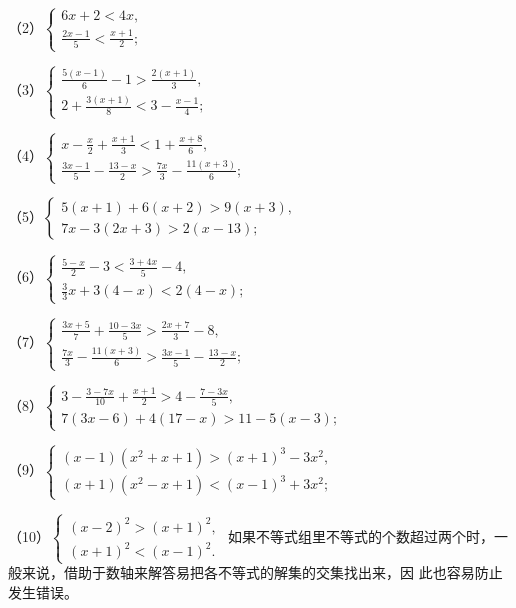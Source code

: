 （2）\(\left\{ \begin{array}{l} 6x + 2 < 4x, \\ \frac{2x - 1}{5} < \frac{x + 1}{2}; \end{array} \right.\)

（3）\(\left\{ \begin{array}{l} \frac{5(x - 1)}{6} - 1 > \frac{2(x + 1)}{3}, \\ 2 + \frac{3(x + 1)}{8} < 3 - \frac{x - 1}{4}; \end{array} \right.\)

（4）\(\left\{ \begin{array}{l} x - \frac{x}{2} + \frac{x + 1}{3} < 1 + \frac{x + 8}{6}, \\ \frac{3x - 1}{5} - \frac{13 - x}{2} > \frac{7x}{3} - \frac{11(x + 3)}{6}; \end{array} \right.\)

（5）\(\left\{ \begin{array}{l} 5(x + 1) + 6(x + 2) > 9(x + 3), \\ 7x - 3(2x + 3) > 2(x - 13); \end{array} \right.\)

（6）\(\left\{ \begin{array}{l} \frac{5 - x}{2} - 3 < \frac{3 + 4x}{5} - 4, \\ \frac{3}{3} x + 3(4 - x) < 2(4 - x); \end{array} \right.\)

（7）\(\left\{ \begin{array}{l} \frac{3x + 5}{7} + \frac{10 - 3x}{5} > \frac{2x + 7}{3} - 8, \\ \frac{7x}{3} - \frac{11(x + 3)}{6} > \frac{3x - 1}{5} - \frac{13 - x}{2}; \end{array} \right.\)

（8）\(\left\{ \begin{array}{l} 3 - \frac{3 - 7x}{10} + \frac{x + 1}{2} > 4 - \frac{7 - 3x}{5}, \\ 7(3x - 6) + 4(17 - x) > 11 - 5(x - 3); \end{array} \right.\)

（9）\(\left\{ \begin{array}{l} (x - 1)(x^2 + x + 1) > (x + 1)^3 - 3x^2, \\ (x + 1)(x^2 - x + 1) < (x - 1)^3 + 3x^2; \end{array} \right.\)

（10）\(\left\{ \begin{array}{l} (x - 2)^2 > (x + 1)^2, \\ (x + 1)^2 < (x - 1)^2. \end{array} \right.\)
如果不等式组里不等式的个数超过两个时，一般来说，借助于数轴来解答易把各不等式的解集的交集找出来，因
此也容易防止发生错误。

